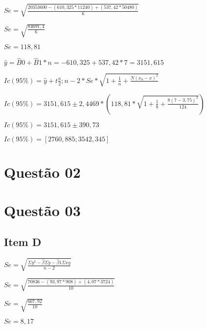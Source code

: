 \documentclass{article}
\begin{document}
    \begin{flushleft}
        $Se = \sqrt{ \frac{20353600 - (610,325 * 11240)+ (537,42 * 50480) }{6}}$

        $Se = \sqrt{ \frac{84691,4 }{6}}$

        $Se = 118,81$
    \end{flushleft}   

    \begin{flushleft}
        $\hat{y} = \hat{B}0 + \hat{B}1 *n = -610,325 + 537,42 * 7=3151,615$
    \end{flushleft}   

    \begin{flushleft}
        $Ic(95\%) = \hat{y} + t\frac{a}{2};n-2 *Se* \sqrt{1 + \frac{1}{n} +\frac{N(x_0 -x)^2}{}}$

        $Ic(95\%) = 3151,615 \pm 2,4469 *  (118,81* \sqrt{1 + \frac{1}{8} + \frac{8(7-3,75)^2}{124}})$
        
        $Ic(95\%) =  3151,615 \pm 390,73$

        $Ic(95\%) = [2760,885;3542,345]$
    \end{flushleft}


\section{Questão 02}   

\section{Questão 03}    
    
        \subsection{Item D}
            \begin{flushleft}
                $Se = \sqrt{ \frac{\Sigma y^2 - \hat{\beta } \Sigma y - \hat{\beta}1 \Sigma xy }{n-2}}$
            \end{flushleft}    
            
            \begin{flushleft}
                $Se = \sqrt{ \frac{70836 - (93,97*908)+ (4,07*3724) }{10}}$

                $Se = \sqrt{ \frac{667,92 }{10}}$

                $Se = 8,17$
            \end{flushleft}      
\end{document}
